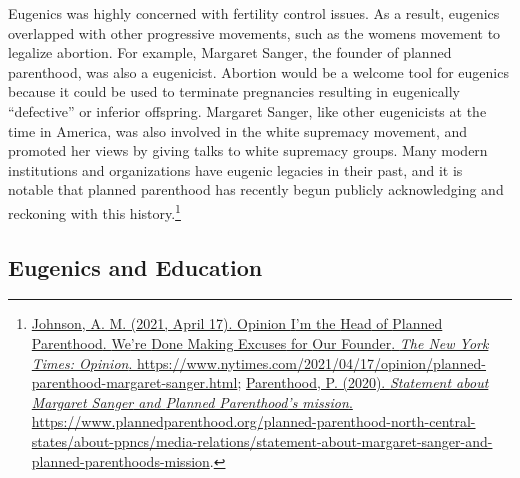 \documentclass[
  oneside,
  12pt]{crumpbook}
\begin{document}
Eugenics was highly concerned with fertility control issues. As a result, eugenics overlapped with other progressive movements, such as the womens movement to legalize abortion. For example, Margaret Sanger, the founder of planned parenthood, was also a eugenicist. Abortion would be a welcome tool for eugenics because it could be used to terminate pregnancies resulting in eugenically ``defective'' or inferior offspring. Margaret Sanger, like other eugenicists at the time in America, was also involved in the white supremacy movement, and promoted her views by giving talks to white supremacy groups. Many modern institutions and organizations have eugenic legacies in their past, and it is notable that planned parenthood has recently begun publicly acknowledging and reckoning with this history.\footnote{\protect\hyperlink{ref-johnsonOpinionHeadPlanned2021}{Johnson, A. M. (2021, April 17). Opinion \textbar{} {I}'m the {Head} of {Planned Parenthood}. {We}'re {Done Making Excuses} for {Our Founder}. \emph{The New York Times: Opinion}. \url{https://www.nytimes.com/2021/04/17/opinion/planned-parenthood-margaret-sanger.html}}; \protect\hyperlink{ref-plannedparenthoodStatementMargaretSanger2020}{Parenthood, P. (2020). \emph{Statement about {Margaret Sanger} and {Planned Parenthood}'s mission}. \url{https://www.plannedparenthood.org/planned-parenthood-north-central-states/about-ppncs/media-relations/statement-about-margaret-sanger-and-planned-parenthoods-mission}}.}

\hypertarget{eugenics-and-education}{%
\subsection{Eugenics and Education}\label{eugenics-and-education}}
\end{document}
